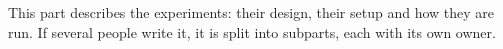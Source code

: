 
This part describes the experiments: their design, their setup and how they are run.
If several people write it, it is split into subparts, each with its own owner.
